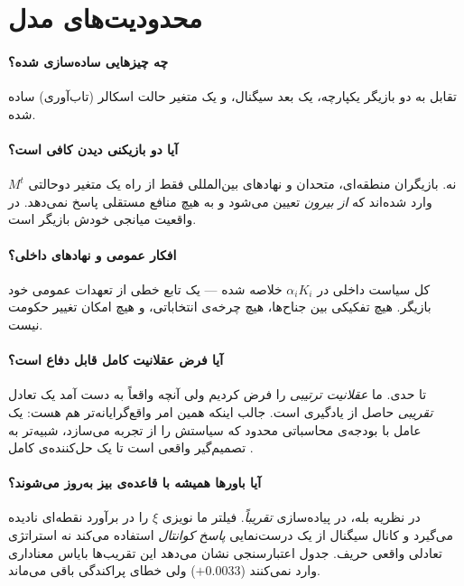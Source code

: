 \documentclass[12pt,a4paper]{article}
\begin{document}
\section{محدودیت‌های مدل}\label{sec:limits}

\paragraph{چه چیزهایی ساده‌سازی شده؟}
تقابل به دو بازیگر یکپارچه، یک بعد سیگنال، و یک متغیر حالت اسکالر
(تاب‌آوری) ساده شده.

\paragraph{آیا دو بازیکنی دیدن کافی است؟}
نه. بازیگران منطقه‌ای، متحدان و نهادهای بین‌المللی فقط از راه یک متغیر
دوحالتی $M^t$ وارد شده‌اند که \emph{از بیرون} تعیین می‌شود و به هیچ منافع مستقلی پاسخ
نمی‌دهد. در واقعیت میانجی خودش بازیگر است.

\paragraph{افکار عمومی و نهادهای داخلی؟}
کل سیاست داخلی در $\alpha_i K_i$ خلاصه شده — یک تابع خطی از تعهدات عمومی
خود بازیگر. هیچ تفکیکی بین جناح‌ها، هیچ چرخه‌ی انتخاباتی، و هیچ امکان
تغییر حکومت نیست.

\paragraph{آیا فرض عقلانیت کامل قابل دفاع است؟}
تا حدی. ما \emph{عقلانیت ترتیبی} را فرض کردیم ولی آنچه واقعاً به دست آمد یک
تعادل \emph{تقریبی} حاصل از یادگیری است. جالب اینکه همین امر واقع‌گرایانه‌تر
هم هست: یک عامل با بودجه‌ی محاسباتی محدود که سیاستش را از تجربه می‌سازد،
شبیه‌تر به تصمیم‌گیر واقعی است تا یک حل‌کننده‌ی کامل .

\paragraph{آیا باورها همیشه با قاعده‌ی بیز به‌روز می‌شوند؟}
در نظریه بله، در پیاده‌سازی \emph{تقریباً}. فیلتر ما نویز‌ی $\xi$ را در
برآورد نقطه‌ای نادیده می‌گیرد و کانال سیگنال از یک درست‌نمایی \emph{پاسخ کوانتال}
استفاده می‌کند نه استراتژی تعادلی واقعی حریف. جدول اعتبارسنجی نشان می‌دهد
این تقریب‌ها بایاس معناداری وارد نمی‌کنند ($+0.0033$) ولی خطای پراکندگی
باقی می‌ماند.
\end{document}

